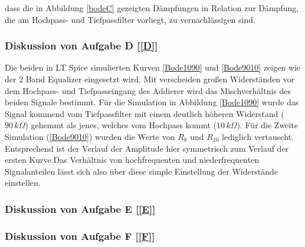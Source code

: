 dass die in Abbildung \ref{bodeC} gezeigten Dämpfungen in Relation zur Dämpfung, die am Hochpass- und Tiefpassfilter vorliegt, zu vernachlässigen sind.
\subsubsection{Diskussion von Aufgabe D [\ref{D}]}
Die beiden in LT Spice simulierten Kurven \ref{Bode1090} und \ref{Bode9010} zeigen wie der 2 Band Equalizer eingesetzt wird. Mit verscheiden großen Widerständen vor dem Hochpass- und Tiefpasseingang des Addierer wird das Mischverhältnis des beiden Signale bestimmt. Für die Simulation in Abbildung \ref{Bode1090} wurde das Signal kommend vom Tiefpassfilter mit einem deutlich höheren Widerstand ($\si{90}{\,k \Omega}$) gehemmt als jenes, welches vom Hochpass kommt ($\si{10}{\,k\Omega}$). Für die Zweite Simulation (\ref{Bode9010}) wurden die Werte von $R_{8}$ und $R_{10}$ lediglich vertauscht. Entsprechend ist der Verlauf der Amplitude hier symmetrisch zum Verlauf der ersten Kurve.\newline Das Verhältnis von hochfrequenten und niederfrequenten Signalanteilen lässt sich also über diese simple Einstellung der Widerstände einstellen.
\subsubsection{Diskussion von Aufgabe E [\ref{E}]}
\subsubsection{Diskussion von Aufgabe F [\ref{F}]}




